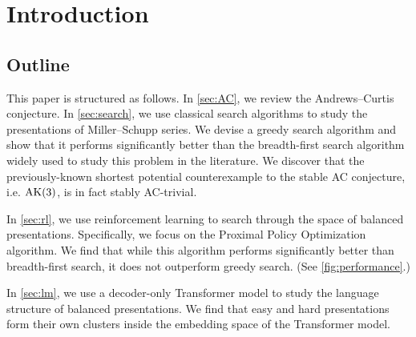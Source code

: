 
\section{Introduction\label{sec:intro}}

\TBW

\subsection*{Outline}

This paper is structured as follows. In \autoref{sec:AC}, we review the Andrews--Curtis conjecture. In \autoref{sec:search}, we use classical search algorithms to study the presentations of Miller--Schupp series. We devise a greedy search algorithm and show that it performs significantly better than the breadth-first search algorithm widely used to study this problem in the literature. We discover that the previously-known shortest potential counterexample to the stable AC conjecture, i.e. $\text{AK}(3)$, is in fact stably AC-trivial.

In \autoref{sec:rl}, we use reinforcement learning to search through the space of balanced presentations. Specifically, we focus on the Proximal Policy Optimization algorithm. We find that while this algorithm performs significantly better than breadth-first search, it does not outperform greedy search. (See \autoref{fig:performance}.)

In \autoref{sec:lm}, we use a decoder-only Transformer model to study the language structure of balanced presentations. We find that easy and hard presentations form their own clusters inside the embedding space of the Transformer model.


